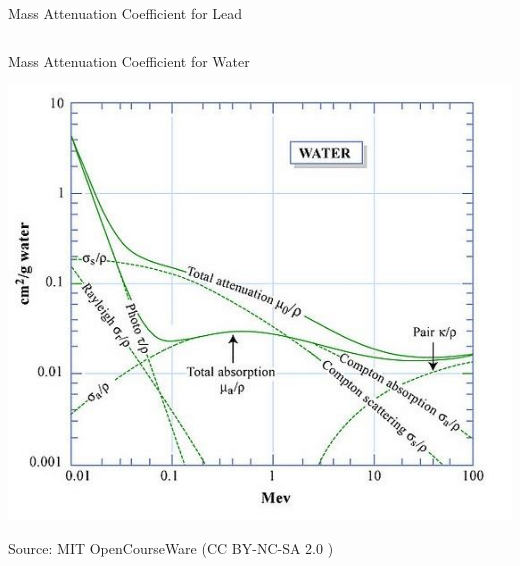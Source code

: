 \begin{frame}{Mass Attenuation Coefficient for Lead}
\begin{columns}[c, onlytextwidth]
\begin{column}{0.5\textwidth}
\begin{itemize}
            \end{itemize}

        \end{column}
    \end{columns}
\end{frame}


\begin{frame}{Mass Attenuation Coefficient for Water}
    \begin{center}\includegraphics[height=0.8\textheight ]{images/Mass-attenuation-coefficients-for-photons-in-water-source-MIT-OpenCourseWare-22101.png}\end{center}
    \begin{flushright}
        \tiny Source: MIT OpenCourseWare (CC BY-NC-SA 2.0 )
    \end{flushright}
\end{frame}




